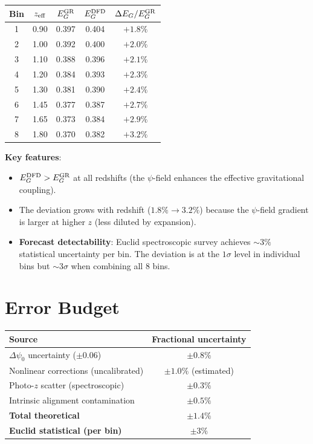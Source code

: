 \documentclass[11pt,a4paper]{article}
\begin{document}
\begin{center}
\begin{longtable}{ccccc}
\toprule
\textbf{Bin} & \textbf{$z_{\rm eff}$} & \textbf{$E_G^{\rm GR}$} & \textbf{$E_G^{\rm DFD}$} & \textbf{$\Delta E_G / E_G^{\rm GR}$} \\
\midrule
1 & 0.90 & 0.397 & 0.404 & $+1.8\%$ \\
2 & 1.00 & 0.392 & 0.400 & $+2.0\%$ \\
3 & 1.10 & 0.388 & 0.396 & $+2.1\%$ \\
4 & 1.20 & 0.384 & 0.393 & $+2.3\%$ \\
5 & 1.30 & 0.381 & 0.390 & $+2.4\%$ \\
6 & 1.45 & 0.377 & 0.387 & $+2.7\%$ \\
7 & 1.65 & 0.373 & 0.384 & $+2.9\%$ \\
8 & 1.80 & 0.370 & 0.382 & $+3.2\%$ \\
\bottomrule
\end{longtable}
\end{center}

\textbf{Key features}:
\begin{itemize}
\item $E_G^{\rm DFD} > E_G^{\rm GR}$ at all redshifts (the $\psi$-field enhances the effective gravitational coupling).
\item The deviation grows with redshift ($1.8\% \to 3.2\%$) because the $\psi$-field gradient is larger at higher $z$ (less diluted by expansion).
\item \textbf{Forecast detectability}: Euclid spectroscopic survey achieves $\sim 3\%$ statistical uncertainty per bin. The deviation is at the $1\sigma$ level in individual bins but $\sim 3\sigma$ when combining all 8 bins.
\end{itemize}

\section{Error Budget}

\begin{center}
\begin{tabular}{lc}
\toprule
\textbf{Source} & \textbf{Fractional uncertainty} \\
\midrule
$\Delta\psi_0$ uncertainty ($\pm 0.06$) & $\pm 0.8\%$ \\
Nonlinear corrections (uncalibrated) & $\pm 1.0\%$ (estimated) \\
Photo-$z$ scatter (spectroscopic) & $\pm 0.3\%$ \\
Intrinsic alignment contamination & $\pm 0.5\%$ \\
\midrule
\textbf{Total theoretical} & $\pm 1.4\%$ \\
\textbf{Euclid statistical (per bin)} & $\pm 3\%$ \\
\bottomrule
\end{tabular}
\end{center}
\end{document}
